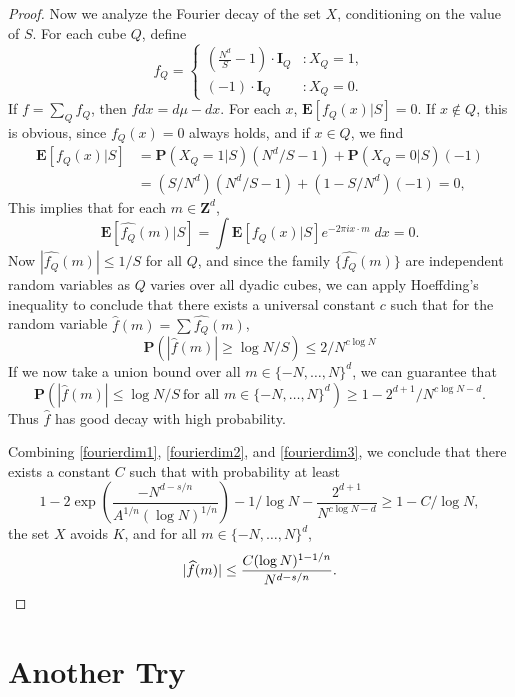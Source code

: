 \begin{proof}
	Now we analyze the Fourier decay of the set $X$, conditioning on the value of $S$. For each cube $Q$, define
	\[ f_Q = \begin{cases} \left( \frac{N^d}{S} - 1 \right) \cdot \mathbf{I}_Q & : X_Q = 1, \\ \left( -1 \right) \cdot \mathbf{I}_Q & : X_Q = 0. \end{cases} \]
	If $f = \sum_Q f_Q$, then $f dx = d\mu - dx$. For each $x$, $\mathbf{E}[f_Q(x)|S] = 0$. If $x \not \in Q$, this is obvious, since $f_Q(x) = 0$ always holds, and if $x \in Q$, we find
	\begin{align*}
		\mathbf{E}[f_Q(x)|S] &= \mathbf{P}(X_Q = 1|S) (N^d/S - 1) + \mathbf{P}(X_Q = 0|S) (-1)\\
		&= (S/N^d)(N^d/S - 1) + (1 - S/N^d)(-1) = 0,
	\end{align*}
	This implies that for each $m \in \mathbf{Z}^d$,
	\[ \mathbf{E} \left[ \widehat{f_Q}(m)|S \right] = \int \mathbf{E}[f_Q(x) | S] e^{- 2 \pi i x \cdot m}\; dx = 0. \]
	Now $|\widehat{f_Q}(m)| \leq 1/S$ for all $Q$, and since the family $\big\{ \widehat{f_Q}(m) \big\}$ are independent random variables as $Q$ varies over all dyadic cubes, we can apply Hoeffding's inequality to conclude that there exists a universal constant $c$ such that for the random variable $\widehat{f}(m) = \sum \widehat{f_Q}(m)$,
	\[ \mathbf{P} \left( |\widehat{f}(m)| \geq \log N /S \right) \leq 2/N^{c \log N} \]
	If we now take a union bound over all $m \in \{ -N, \dots, N \}^d$, we can guarantee that
	\begin{equation} \label{fourierdim3}
		\mathbf{P} \left( |\widehat{f}(m)| \leq \log N/S\ \text{for all $m \in \{ -N, \dots, N\}^d$} \right) \geq 1 - 2^{d+1}/N^{c \log N - d}.
	\end{equation}
	Thus $\widehat{f}$ has good decay with high probability.

	Combining \eqref{fourierdim1}, \eqref{fourierdim2}, and \eqref{fourierdim3}, we conclude that there exists a constant $C$ such that with probability at least
	\[ 1 - 2 \exp \left( \frac{-N^{d-s/n}}{A^{1/n} (\log N)^{1/n}} \right) - 1/\log N - \frac{2^{d+1}}{N^{c \log N - d}} \geq 1 - C / \log N, \]
	the set $X$ avoids $K$, and for all $m \in \{ -N, \dots, N \}^d$,
	\[ |\widehat{f}(m)| \leq \frac{C (\log N)^{1-1/n}}{N^{d-s/n}}. \qedhere \]
\end{proof}

\section{Another Try}

